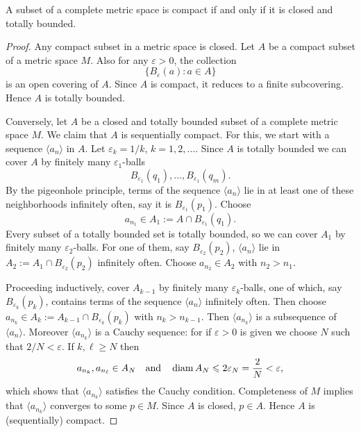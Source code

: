 \begin{thm}
  A subset of a complete metric space is compact if and only if it is closed and totally bounded.
\end{thm}

\begin{proof}
  Any compact subset in a metric space is closed.
  Let $A$ be a compact subset of a metric space $M$.
  Also for any $\varepsilon > 0$, the collection
  \[
    \{ B_\varepsilon(a) \colon a \in A \}
  \]
  is an open covering of $A$.
  Since $A$ is compact, it reduces to a finite subcovering.
  Hence $A$ is totally bounded.

  Conversely, let $A$ be a closed and totally bounded subset of a complete metric space $M$.
  We claim that $A$ is sequentially compact.
  For this, we start with a sequence $\langle a_n \rangle$ in $A$.
  Let $\varepsilon_k = 1/k$, $k = 1, 2, \dots$.
  Since $A$ is totally bounded we can cover $A$ by finitely many $\varepsilon_1$-balls
  \[
    B_{\varepsilon_1}(q_1), \dots, B_{\varepsilon_1}(q_m).
  \]
  By the pigeonhole principle, terms of the sequence $\langle a_n \rangle$ lie in at least one of these neighborhoods infinitely often, say it is $B_{\varepsilon_1}(p_1)$.
  Choose
  \[
    a_{n_1} \in A_1 := A \cap B_{\varepsilon_1}(q_1).
  \]
  Every subset of a totally bounded set is totally bounded, so we can cover $A_1$ by finitely many $\varepsilon_2$-balls.
  For one of them, say $B_{\varepsilon_2}(p_2)$, $\langle a_n \rangle$ lie in $A_2 := A_1 \cap B_{\varepsilon_2}(p_2)$ infinitely often.
  Choose $a_{n_2} \in A_2$ with $n_2 > n_1$.

  Proceeding inductively, cover $A_{k-1}$ by finitely many $\varepsilon_k$-balls, one of which, say $B_{\varepsilon_k}(p_k)$, contains terms of the sequence $\langle a_n \rangle$ infinitely often.
  Then choose $a_{n_k} \in A_k := A_{k-1} \cap B_{\varepsilon_k}(p_k)$ with $n_k > n_{k-1}$.
  Then $\langle a_{n_k} \rangle$ is a subsequence of $\langle a_n \rangle$.
  Moreover $\langle a_{n_k} \rangle$ is a Cauchy sequence: for if $\varepsilon > 0$ is given we choose $N$ such that $2/N < \varepsilon$.  If $k, \ell \geqslant N$ then
  \[
    a_{n_k}, a_{n_\ell} \in A_N \quad \text{and} \quad
    \operatorname{diam} A_N \leqslant 2 \varepsilon_N = \frac{2}{N} < \varepsilon,
  \]
  which shows that $\langle a_{n_k} \rangle$ satisfies the Cauchy condition.
  Completeness of $M$ implies that $\langle a_{n_k} \rangle$ converges to some $p \in M$.
  Since $A$ is closed, $p \in A$.  Hence $A$ is (sequentially) compact.
\end{proof}

